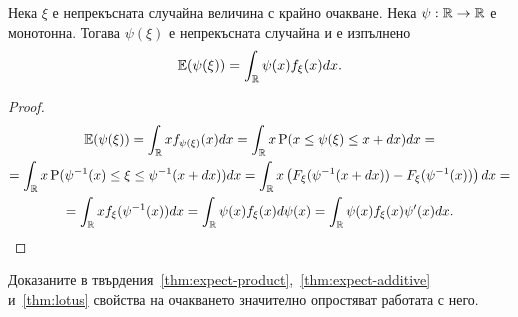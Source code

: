 \documentclass[numbers=endperiod, DIV=15, bibliography=totocnumbered]{scrartcl}
\begin{document}
\begin{proposition}\label{thm:lotus}
  Нека $\xi$ е непрекъсната случайна величина с крайно очакване. Нека $\psi: \mathbb{R} \to \mathbb{R}$ е монотонна. Тогава $\psi(\xi)$ е непрекъсната случайна и е изпълнено
  \begin{displaymath}
    \mathbb{E}(\psi(\xi))
    =
    \int_{\mathbb{R}} \psi(x) f_\xi(x) dx.
  \end{displaymath}
\end{proposition}

\begin{proof}
  \begin{multline*}
    \mathbb{E}(\psi(\xi))
    =
    \int_{\mathbb{R}} x f_{\psi(\xi)}(x) dx
    =
    \int_{\mathbb{R}} x \operatorname{P}(x \leq \psi(\xi) \leq x + dx) dx
    = \\ =
    \int_{\mathbb{R}} x \operatorname{P}(\psi^{-1}(x) \leq \xi \leq \psi^{-1}(x + dx)) dx
    =
    \int_{\mathbb{R}} x \left( F_\xi(\psi^{-1}(x + dx)) - F_\xi(\psi^{-1}(x)) \right) dx
    = \\ =
    \int_{\mathbb{R}} x f_\xi(\psi^{-1}(x)) dx
    =
    \int_{\mathbb{R}} \psi(x) f_\xi(x) d \psi(x)
    =
    \int_{\mathbb{R}} \psi(x) f_\xi(x) \psi'(x) dx.
  \end{multline*}
\end{proof}

Доказаните в твърдения~\ref{thm:expect-product},~\ref{thm:expect-additive} и~\ref{thm:lotus} свойства на очакването значително опростяват работата с него.
\end{document}
